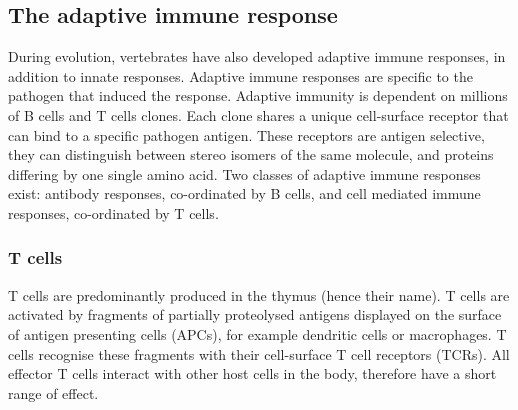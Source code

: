 \subsection{The adaptive immune response}
During evolution, vertebrates have also developed adaptive immune responses, in addition to innate responses\cite{hoffmann2013innate}.
Adaptive immune responses are specific to the pathogen that induced the response.
Adaptive immunity is dependent on millions of B cells and T cells clones.
Each clone shares a unique cell-surface receptor that can bind to a specific pathogen antigen.
These receptors are antigen selective, they can distinguish between stereo isomers of the same molecule, and proteins differing by one single amino acid.
Two classes of adaptive immune responses exist: antibody responses, co-ordinated by B cells, and cell mediated immune responses, co-ordinated by T cells\cite{alberts2007molecularimmune}.
%
\subsubsection{T cells}
T cells are predominantly produced in the thymus (hence their name).
T cells are activated by fragments of partially proteolysed antigens displayed on the surface of antigen presenting cells (APCs), for example dendritic cells or macrophages.
T cells recognise these fragments with their cell-surface T cell receptors (TCRs)\@.
All effector T cells interact with other host cells in the body, therefore have a short range of effect\cite{alberts2007molecularimmune}.

